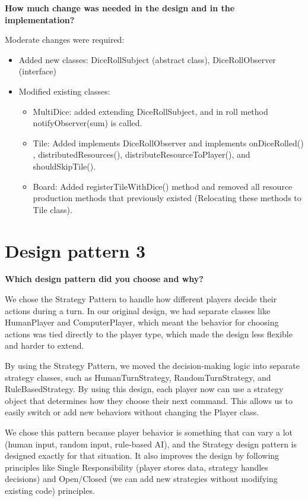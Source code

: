 \textbf{How much change was needed in the design and in the implementation?}

Moderate changes were required: 

\begin{itemize}
    \item Added new classes: DiceRollSubject (abstract class), DiceRollObserver (interface) 
    
    \item Modified existing classes: 
    \begin{itemize}
        \item MultiDice: added extending DiceRollSubject, and in roll method notifyObserver(sum) is called. 
        \item Tile: Added implements  DiceRollObserver and implements onDiceRolled() , distributedResources(), distributeResourceToPlayer(), and shouldSkipTile().
        \item Board: Added registerTileWithDice() method and removed all resource production methods that previously existed (Relocating these methods to Tile class).
    \end{itemize}
\end{itemize}

\section{Design pattern 3}

\textbf{Which design pattern did you choose and why?}

We chose the Strategy Pattern to handle how different players decide their actions during a turn. In our original design, we had separate classes like HumanPlayer and ComputerPlayer, which meant the behavior for choosing actions was tied directly to the player type, which made the design less flexible and harder to extend.

By using the Strategy Pattern, we moved the decision-making logic into separate strategy classes, such as HumanTurnStrategy, RandomTurnStrategy, and RuleBasedStrategy. By using this design, each player now can use a strategy object that determines how they choose their next command. This allows us to easily switch or add new behaviors without changing the Player class.

We chose this pattern because player behavior is something that can vary a lot (human input, random input, rule-based AI), and the Strategy design pattern is designed exactly for that situation. It also improves the design by following principles like Single Responsibility (player stores data, strategy handles decisions) and Open/Closed (we can add new strategies without modifying existing code) principles.
\\\\\\

